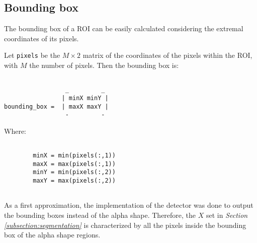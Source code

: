     \subsection{Bounding box}\label{subsection:bounding_box}
        \par{
            The bounding box of a ROI can be easily calculated considering the extremal coordinates of its pixels.
        }
        \par{
            Let \texttt{pixels} be the $M \times 2$ matrix of the coordinates of the pixels within the ROI, with $M$ the number of pixels. Then the bounding box is: 
        }
        \par{
            \begin{BVerbatim}

                 _         _         
                | minX minY |
bounding_box =  | maxX maxY |
                 -         - 
            \end{BVerbatim}
        }
        \par{
            Where:
        }
        \par{
            \begin{BVerbatim} 

        minX = min(pixels(:,1))
        maxX = max(pixels(:,1))
        minY = min(pixels(:,2))
        maxY = max(pixels(:,2))
   
            \end{BVerbatim}
        }
        \par{
            As a first approximation, the implementation of the detector was done to output the bounding boxes instead of the alpha shape. Therefore, the $X$ set in \emph{Section \ref{subsection:segmentation}} is characterized by all the pixels inside the bounding box of the alpha shape regions.
        }
